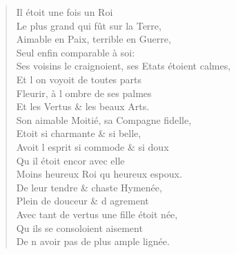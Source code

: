 \documentclass[14pt,a4paper]{memoir}
\begin{document}
{{\begin{otherlanguage}{french}
\begin{verse}
\vin Il étoit une fois un Roi \\
\vin\vin Le plus grand qui fût sur la Terre, \\
\vin Aimable en Paix, terrible en Guerre, \\
\vin Seul enfin comparable à soi: \\
Ses voisins le craignoient, ses Etats étoient calmes, \\
\vin Et l\textquotesingle{} on voyoit de toutes parts \\
\vin Fleurir, à l\textquotesingle{} ombre de ses palmes \\
\vin Et les Vertus \& les beaux Arts. \\
Son aimable Moitié, sa Compagne fidelle, \\
\vin Etoit si charmante \& si belle, \\
Avoit l\textquotesingle{} esprit si commode \& si doux \\
\vin Qu\textquotesingle{} il étoit encor avec elle \\
\vin Moins heureux Roi qu\textquotesingle{} heureux espoux. \\
\vin De leur tendre \& chaste Hymenée, \\
\vin Plein de douceur \& d\textquotesingle{} agrement \\
Avec tant de vertus une fille étoit née, \\
\vin Qu\textquotesingle{} ils se consoloient aisement \\
\vin De n\textquotesingle{} avoir pas de plus ample lignée.


\end{verse}
\end{otherlanguage}}}
\end{document}
